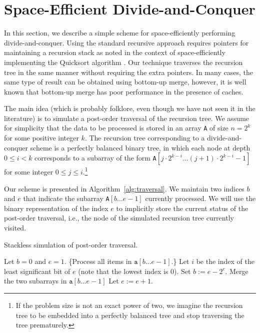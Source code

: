 
\section{Space-Efficient Divide-and-Conquer}

In this section, we describe a simple scheme for space-efficiently
performing divide-and-conquer.  Using the standard recursive approach
requires  pointers for maintaining a recursion stack as
noted in the context of space-efficiently implementing the Quicksort
algorithm \cite{huang:one-way,wegner:generalized}. Our technique
traverses the recursion tree in the same manner without requiring the
extra pointers. In many cases, the same type of result can be obtained
using bottom-up merge, however, it is well known that bottom-up merge
has poor performance in the presence of caches.

The main idea (which is probably folklore, even though we have not
seen it in the literature) is to simulate a post-order traversal of
the recursion tree. We assume for simplicity that the data to be
processed is stored in an array \texttt{A} of size $n = 2^k$ for some
positive integer $k$. The recursion tree corresponding to a
divide-and-conquer scheme is a perfectly balanced binary tree, in
which each node at depth $0 \leq i < k$ corresponds to a subarray of
the form \texttt{A}$[j \cdot 2^{k-i} \ldots (j + 1) \cdot 2^{k-i} -
1]$ for some integer $0 \leq j \leq i$.\footnote{If the problem size
  is not an exact power of two, we imagine the recursion tree to be
  embedded into a perfectly balanced tree and stop traversing the tree
  prematurely.}

Our scheme is presented in Algorithm~\ref{alg:traversal}. We maintain
two indices $b$ and $e$ that indicate the subarray \texttt{A}$[b
\ldots e-1]$ currently processed. We will use the binary
representation of the index $e$ to implicitly store the current status
of the post-order traversal, i.e., the node of the simulated recursion
tree currently visited.

\begin{algorithm}
  \caption{Stackless simulation of post-order traversal.}
  \label{alg:traversal}
  \begin{algorithmic}[1]
    \STATE Let $b=0$ and $e=1$.
    \STATE \{Process all items in $\texttt{a}[b\ldots e-1]$.\}
    \STATE Let $i$ be the index of the least significant bit of $e$
    (note that the lowest index is $0$).
    \STATE Set $b := e-2^c$.
    \STATE Merge the two subarrays in $\texttt{a}[b\ldots e-1]$
    \ENDFOR 
    \STATE Let $e := e + 1$.
    \ENDWHILE
  \end{algorithmic}
\end{algorithm}

